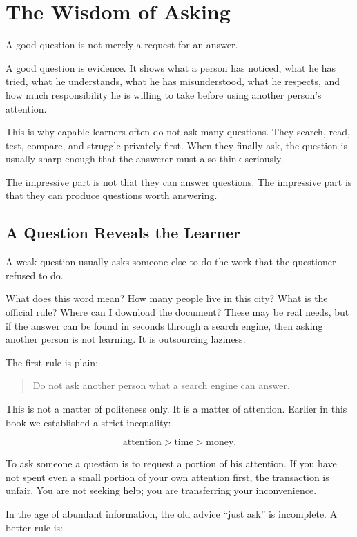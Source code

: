 \chapter{The Wisdom of Asking}

A good question is not merely a request for an answer.

A good question is evidence. It shows what a person has noticed, what he has tried, what he understands, what he has misunderstood, what he respects, and how much responsibility he is willing to take before using another person's attention.

This is why capable learners often do not ask many questions. They search, read, test, compare, and struggle privately first. When they finally ask, the question is usually sharp enough that the answerer must also think seriously.

The impressive part is not that they can answer questions. The impressive part is that they can produce questions worth answering.

\section*{A Question Reveals the Learner}

A weak question usually asks someone else to do the work that the questioner refused to do.

What does this word mean? How many people live in this city? What is the official rule? Where can I download the document? These may be real needs, but if the answer can be found in seconds through a search engine, then asking another person is not learning. It is outsourcing laziness.

The first rule is plain:

\begin{quote}
Do not ask another person what a search engine can answer.
\end{quote}

This is not a matter of politeness only. It is a matter of attention. Earlier in this book we established a strict inequality:

\[
\text{attention} > \text{time} > \text{money}.
\]

To ask someone a question is to request a portion of his attention. If you have not spent even a small portion of your own attention first, the transaction is unfair. You are not seeking help; you are transferring your inconvenience.

In the age of abundant information, the old advice ``just ask'' is incomplete. A better rule is:

